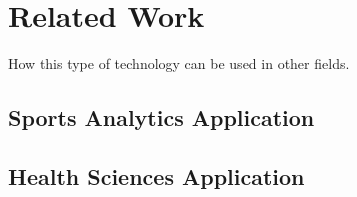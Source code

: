 \chapter{Related Work}\label{ch:related_work}

How this type of technology can be used in other fields. 

\section{Sports Analytics Application}

\section{Health Sciences Application}

